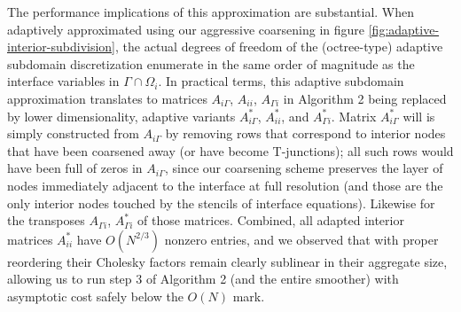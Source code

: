 The performance implications of this approximation are substantial. When adaptively approximated using our aggressive coarsening in figure
\ref{fig:adaptive-interior-subdivision}, the actual degrees of freedom of the (octree-type) adaptive subdomain discretization enumerate in the same order of magnitude as
the interface variables in $\Gamma\cap\Omega_i$. In practical terms, this adaptive subdomain approximation translates to matrices $A_{i\Gamma}$, $A_{ii}$, $A_{\Gamma
  i}$ in Algorithm 2 being replaced by lower dimensionality, adaptive variants  $A^\ast_{i\Gamma}$, $A^\ast_{ii}$, and $A^\ast_{\Gamma i}$. Matrix $A^\ast_{i\Gamma}$
will is simply constructed from $A_{i\Gamma}$ by removing rows that correspond to interior nodes that have been coarsened away (or have become T-junctions); all such
rows would have been full of zeros in $A_{i\Gamma}$, since our coarsening scheme preserves the layer of nodes immediately adjacent to the interface at full
resolution (and those are the only interior nodes touched by the stencils of interface equations). Likewise for the transposes $A_{\Gamma i}$, $A^\ast_{\Gamma i}$ of
those matrices. Combined, all adapted interior matrices $A^\ast_{ii}$ have $O(N^{2/3})$ nonzero entries, and we observed that with proper reordering their Cholesky
factors remain clearly sublinear in their aggregate size, allowing us to run step 3 of Algorithm 2 (and the entire smoother) with asymptotic cost
safely below the $O(N)$ mark. 


